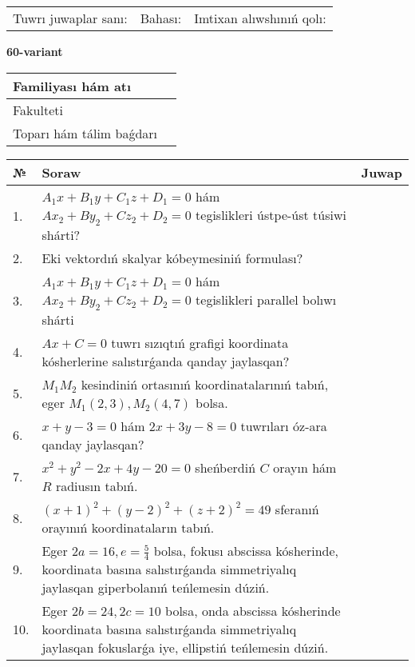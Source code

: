 \documentclass{article}
\begin{document}
\vspace{1cm}

\begin{tabular}{lll}
Tuwrı juwaplar sanı: \underline{\hspace{1.5cm}} & 
Bahası: \underline{\hspace{1.5cm}} & 
Imtixan alıwshınıń qolı: \underline{\hspace{2cm}} \\
\end{tabular}

\egroup

\newpage


\textbf{60-variant}\\

\bgroup
\def\arraystretch{1.6} %

\begin{tabular}{|m{5.7cm}|m{9.5cm}|}
\hline
Familiyası hám atı & \\
\hline
Fakulteti  & \\
\hline
Toparı hám tálim baǵdarı  & \\
\hline
\end{tabular}

\vspace{1cm}

\begin{tabular}{|m{0.7cm}|m{10cm}|m{4cm}|}
\hline
№ & Soraw & Juwap \\
\hline
1. & $A_1x+B_1y+C_1z+D_1=0$ hám $Ax_2+By_2+Cz_2+D_2=0$ tegislikleri ústpe-úst túsiwi shárti? &  \\
\hline
2. & Eki vektordıń skalyar kóbeymesiniń formulası? &  \\
\hline
3. & $A_1x+B_1y+C_1z+D_1=0$ hám $Ax_2+By_2+Cz_2+D_2=0$ tegislikleri parallel bolıwı shárti &  \\
\hline
4. & $Ax+C=0$ tuwrı sızıqtıń grafigi koordinata kósherlerine salıstırǵanda qanday jaylasqan? &  \\
\hline
5. & $M_{1}M_{2}$ kesindiniń ortasınıń koordinatalarınıń tabıń, eger $M_{1} (2, 3), M_{2} (4, 7)$ bolsa. &  \\
\hline
6. & $x+y-3=0$ hám $2x+3y-8=0$ tuwrıları óz-ara qanday jaylasqan? &  \\
\hline
7. & $x^{2}+y^{2}-2x+4y-20=0$ sheńberdiń $C$ orayın hám $R$ radiusın tabıń. &  \\
\hline
8. & $(x+1)^{2}+(y-2) ^{2}+(z+2) ^{2}=49$ sferanıń orayınıń koordinataların tabıń. &  \\
\hline
9. & Eger $2a=16, e=\frac{5}{4}$ bolsa, fokusı abscissa kósherinde, koordinata basına salıstırǵanda simmetriyalıq jaylasqan giperbolanıń teńlemesin dúziń. &  \\
\hline
10. & Eger $2b=24, 2 c=10$ bolsa, onda abscissa kósherinde koordinata basına salıstırǵanda simmetriyalıq jaylasqan fokuslarǵa iye, ellipstiń teńlemesin dúziń. &  \\
\hline
\end{tabular}
\end{document}
